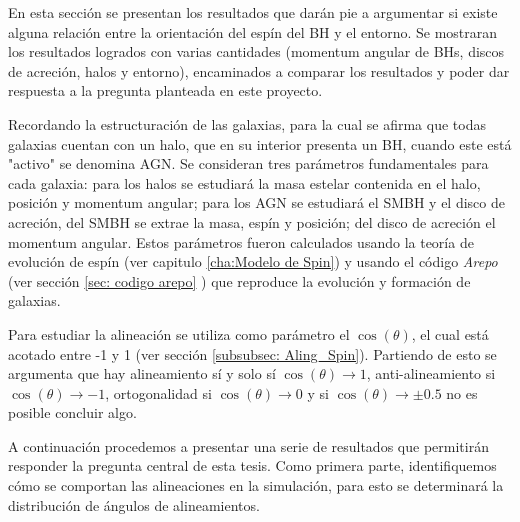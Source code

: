 En esta sección se presentan los resultados que darán pie a argumentar si existe alguna relación entre la orientación del espín del BH y el entorno. Se mostraran los resultados logrados con varias cantidades (momentum angular de BHs, discos de acreción, halos y entorno), encaminados a comparar los resultados y poder dar respuesta a la pregunta planteada en este proyecto. 

Recordando la estructuración de las galaxias, para la cual se afirma que todas galaxias cuentan con un halo, que en su interior presenta un BH, cuando este está "activo" se denomina AGN. Se consideran tres parámetros fundamentales para cada galaxia: para los halos se estudiará la masa estelar contenida en el halo, posición y momentum angular; para los AGN se estudiará el SMBH y el disco de acreción, del SMBH se extrae la masa, espín y posición; del disco de acreción el momentum angular. Estos parámetros fueron calculados usando la teoría de evolución de espín (ver capitulo \ref{cha:Modelo de Spin}) y usando el código {\it{Arepo}} (ver sección \ref{sec: codigo arepo} ) que reproduce la evolución y formación de galaxias. 

Para estudiar la alineación se utiliza como parámetro el $\cos (\theta)$, el cual está acotado entre -1 y 1 (ver sección \ref{subsubsec: Aling_Spin}). Partiendo de esto se argumenta que hay alineamiento sí y solo sí  $\cos (\theta) \to 1$, anti-alineamiento si $\cos (\theta)\to -1$, ortogonalidad si $\cos (\theta)\to 0$ y si $\cos (\theta)\to \pm 0.5 $ no es posible concluir algo.




A continuación procedemos a presentar una serie de resultados que permitirán responder la pregunta central de esta tesis.
Como primera parte, identifiquemos cómo se comportan las alineaciones en la simulación, para esto se determinará la distribución de ángulos de alineamientos. 

